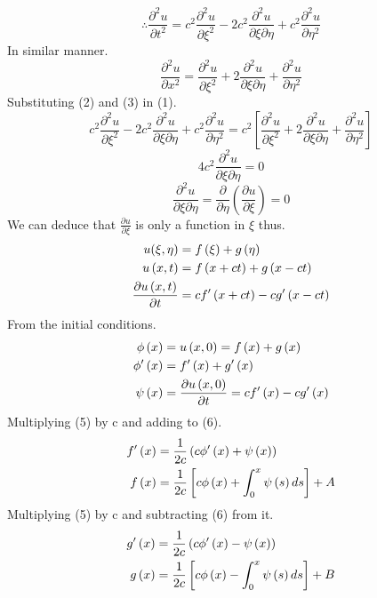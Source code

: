 \begin{equation}
\therefore \frac{\partial^2 u}{\partial t^2} = c^2\frac{\partial^2 u}{\partial\xi^2}-2c^2\frac{\partial^2 u}{\partial\xi\partial\eta}+c^2\frac{\partial^2 u}{\partial\eta^2}
\end{equation}
In similar manner.
\begin{equation}
\frac{\partial^2 u}{\partial x^2} = \frac{\partial^2 u}{\partial\xi^2}+2\frac{\partial^2 u}{\partial\xi\partial\eta}+\frac{\partial^2 u}{\partial\eta^2}
\end{equation}
Substituting (2) and (3) in (1).
\[
c^2\frac{\partial^2 u}{\partial\xi^2}-2c^2\frac{\partial^2 u}{\partial\xi\partial\eta}+c^2\frac{\partial^2 u}{\partial\eta^2} = c^2\left[\frac{\partial^2 u}{\partial\xi^2}+2\frac{\partial^2 u}{\partial\xi\partial\eta}+\frac{\partial^2 u}{\partial\eta^2}\right]    
\]
\[
    4c^2 \frac{\partial^2 u}{\partial\xi\partial\eta} =0    
\]
\[
    \frac{\partial^2 u}{\partial\xi\partial\eta} = \frac{\partial}{\partial\eta}\left(\frac{\partial u}{\partial\xi}\right)= 0    
\]
We can deduce that $\displaystyle \frac{\partial u}{\partial\xi}$ is only a function in $\xi$ thus.
\begin{align}
u(\xi , \eta) &= f\left(\xi\right)+g\left(\eta \right)\notag
\\
u\left(x,t\right)&=f\left(x+ct\right)+g\left(x-ct\right)
\\
\frac{\partial u\left(x,t\right)}{\partial t} &= cf'\left(x+ct\right)-cg'\left(x-ct\right)\notag
\end{align}
From the initial conditions.
\begin{align}
\phi\left(x\right) &= u\left(x,0\right)= f\left(x\right)+g\left(x\right)\notag
\\ 
\phi'\left(x\right) &= f'\left(x\right)+g'\left(x\right)
\\ 
\psi\left(x\right)&=\frac{\partial u\left(x,0\right)}{\partial t} = cf'\left(x\right)-cg'\left(x\right)
\end{align}
Multiplying (5) by c and adding to (6).
\begin{align}
f'\left(x\right) &= \frac{1}{2c}\left(c\phi'\left(x\right)+\psi\left(x\right)\right)\notag
\\ 
f\left(x\right) &= \frac{1}{2c}\left[c\phi\left(x\right)+\int_0^x \psi\left(s\right)ds\right]+A
\end{align}
Multiplying (5) by c and subtracting (6) from it.
\begin{align}
g'\left(x\right) &= \frac{1}{2c}\left(c\phi'\left(x\right)-\psi\left(x\right)\right)\notag
\\ 
g\left(x\right) &= \frac{1}{2c}\left[c\phi\left(x\right)-\int_0^x \psi\left(s\right)ds\right]+B
\end{align}
